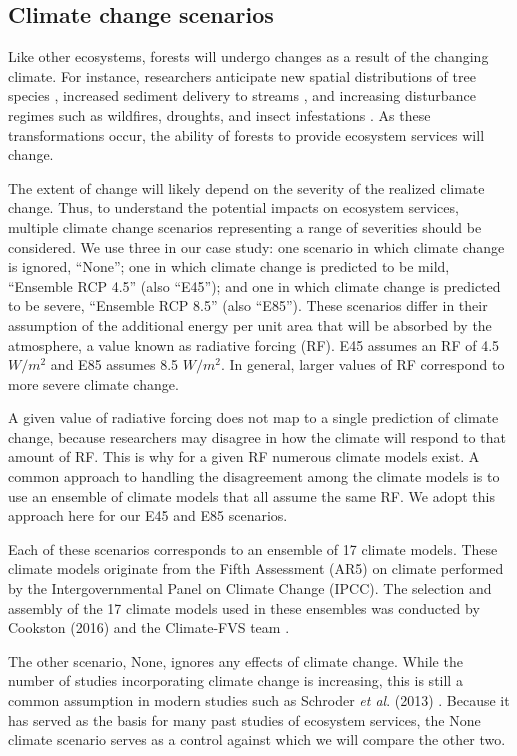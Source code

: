 \subsection{Climate change scenarios}
\label{sec:climateChange}
Like other ecosystems, forests will undergo changes as a result of the changing climate. For instance, researchers anticipate new spatial distributions of tree species \cite{iverson1998predicting}, increased sediment delivery to streams \cite{Goode20121}, and increasing disturbance regimes such as wildfires, droughts, and insect infestations \cite{vose2012effects}. As these transformations occur, the ability of forests to provide ecosystem services will change.

The extent of change will likely depend on the severity of the realized climate change. Thus, to understand the potential impacts on ecosystem services, multiple climate change scenarios representing a range of severities should be considered. We use three in our case study: one scenario in which climate change is ignored, ``None''; one in which climate change is predicted to be mild, ``Ensemble RCP 4.5'' (also ``E45''); and one in which climate change is predicted to be severe, ``Ensemble RCP 8.5'' (also ``E85''). These scenarios differ in their assumption of the additional energy per unit area that will be absorbed by the atmosphere, a value known as radiative forcing (RF). E45 assumes an RF of 4.5 $W/m^2$ and E85 assumes 8.5 $W/m^2$. In general, larger values of RF correspond to more severe climate change.

A given value of radiative forcing does not map to a single prediction of climate change, because researchers may disagree in how the climate will respond to that amount of RF. This is why for a given RF numerous climate models exist. A common approach to handling the disagreement among the climate models is to use an ensemble of climate models that all assume the same RF. We adopt this approach here for our E45 and E85 scenarios.

Each of these scenarios corresponds to an ensemble of 17 climate models. These climate models originate from the Fifth Assessment (AR5) on climate performed by the Intergovernmental Panel on Climate Change (IPCC). The selection and assembly of the 17 climate models used in these ensembles was conducted by Cookston (2016) and the Climate-FVS team \cite{ClimateModelsInFVSEnsemble}.

The other scenario, None, ignores any effects of climate change. While the number of studies incorporating climate change is increasing, this is still a common assumption in modern studies such as Schroder \textit{et al}. (2013) \cite{schroder2016multi}. Because it has served as the basis for many past studies of ecosystem services, the None climate scenario serves as a control against which we will compare the other two.

